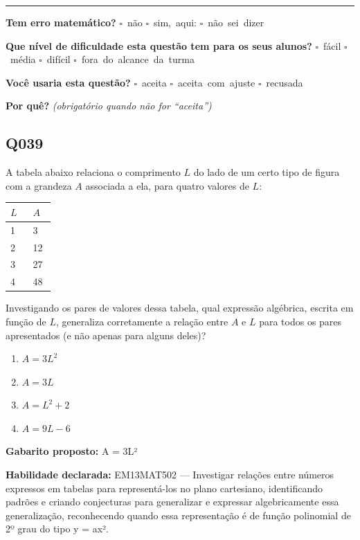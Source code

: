 \documentclass[11pt,a4paper]{article}
\begin{document}
\noindent\rule{\linewidth}{0.4pt}
\textbf{Tem erro matemático?}\quad
\mbox{$\square$~não} \quad \mbox{$\square$~sim, aqui:} \underline{\hspace{5cm}}
\quad \mbox{$\square$~não sei dizer}

\textbf{Que nível de dificuldade esta questão tem para os seus alunos?}\quad
\mbox{$\square$~fácil} \quad \mbox{$\square$~média} \quad
\mbox{$\square$~difícil} \quad \mbox{$\square$~fora do alcance da turma}

\textbf{Você usaria esta questão?}\quad
\mbox{$\square$~aceita} \quad \mbox{$\square$~aceita com ajuste} \quad
\mbox{$\square$~recusada}

\textbf{Por quê?} \emph{(obrigatório quando não for ``aceita'')}

\underline{\hspace{\linewidth}}

\underline{\hspace{\linewidth}}
\vspace{0.6em}

\begin{samepage}
\subsection*{Q039}
A tabela abaixo relaciona o comprimento $L$ do lado de um certo tipo de figura com a grandeza $A$ associada a ela, para quatro valores de $L$:

\begin{center}
\begin{tabular}{|p{0.430\linewidth}|p{0.430\linewidth}|}
\hline
\textbf{$L$} & \textbf{$A$} \\
\hline
1 & 3 \\
\hline
2 & 12 \\
\hline
3 & 27 \\
\hline
4 & 48 \\
\hline
\end{tabular}
\end{center}

Investigando os pares de valores dessa tabela, qual expressão algébrica, escrita em função de $L$, generaliza corretamente a relação entre $A$ e $L$ para todos os pares apresentados (e não apenas para alguns deles)?
\begin{enumerate}[label=(\alph*),nosep,leftmargin=*]
\item $A = 3L^2$
\item $A = 3L$
\item $A = L^2 + 2$
\item $A = 9L - 6$
\end{enumerate}

\textbf{Gabarito proposto:} A = 3L²

\textbf{Habilidade declarada:} EM13MAT502 --- Investigar relações entre números expressos em tabelas para representá-los no plano cartesiano, identificando padrões e criando conjecturas para generalizar e expressar algebricamente essa generalização, reconhecendo quando essa representação é de função polinomial de 2º grau do tipo y = ax².
\end{samepage}
\end{document}
